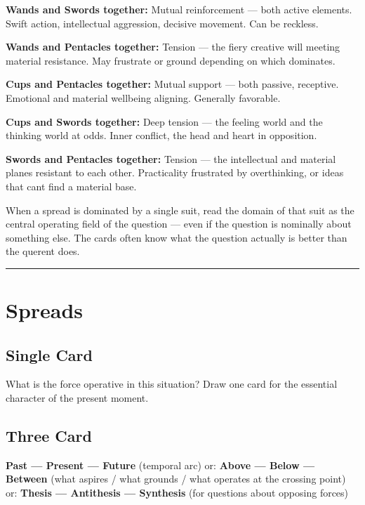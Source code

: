 \textbf{Wands and Swords together:} Mutual reinforcement --- both active elements. Swift action, intellectual aggression, decisive movement. Can be reckless.

\textbf{Wands and Pentacles together:} Tension --- the fiery creative will meeting material resistance. May frustrate or ground depending on which dominates.

\textbf{Cups and Pentacles together:} Mutual support --- both passive, receptive. Emotional and material wellbeing aligning. Generally favorable.

\textbf{Cups and Swords together:} Deep tension --- the feeling world and the thinking world at odds. Inner conflict, the head and heart in opposition.

\textbf{Swords and Pentacles together:} Tension --- the intellectual and material planes resistant to each other. Practicality frustrated by overthinking, or ideas that can\textquotesingle t find a material base.

When a spread is dominated by a single suit, read the domain of that suit as the central operating field of the question --- even if the question is nominally about something else. The cards often know what the question actually is better than the querent does.

\begin{center}\rule{0.5\linewidth}{0.5pt}\end{center}

\section{Spreads}\label{spreads}

\subsection{Single Card}\label{single-card}

What is the force operative in this situation? Draw one card for the essential character of the present moment.

\subsection{Three Card}\label{three-card}

\textbf{Past --- Present --- Future} (temporal arc) or: \textbf{Above --- Below --- Between} (what aspires / what grounds / what operates at the crossing point) or: \textbf{Thesis --- Antithesis --- Synthesis} (for questions about opposing forces)

